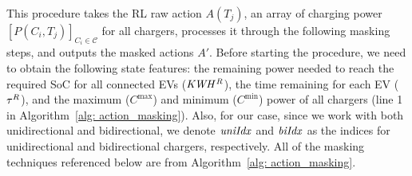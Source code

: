 This procedure takes the RL raw action $A(T_j)$, an array of charging power $[P(C_i, T_j)]_{C_i\in\mathcal{C}}$ for all chargers, processes it through the following masking steps, and outputs the masked actions $A'$. Before starting the procedure, we need to obtain the following state features: the remaining power needed to reach the required SoC for all connected EVs (${\it KWH^{R}}$), the time remaining for each EV ($\tau^R$), and the maximum ($C^{\max}$) and minimum ($C^{\min}$) power of all chargers (line 1 in Algorithm~\ref{alg: action_masking}). Also, for our case, since we work with both unidirectional and bidirectional, we denote ${\it uniIdx}$ and ${\it biIdx}$ as the indices for unidirectional and bidirectional chargers, respectively. All of the masking techniques referenced below are from Algorithm~\ref{alg: action_masking}.
